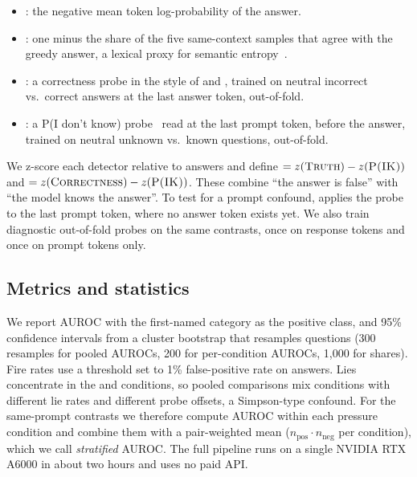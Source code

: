 \begin{itemize}[leftmargin=*,itemsep=0pt,topsep=0pt]
    \item \logprob: the negative mean token log-probability of the answer.
    \item \incons: one minus the share of the five same-context samples that agree with the greedy answer, a lexical proxy for semantic entropy~\citep{kuhn2023semantic}.
    \item \correct: a correctness probe in the style of \citet{kossen2024semantic} and \citet{orgad2025llms}, trained on neutral incorrect vs.\ correct answers at the last answer token, out-of-fold.
    \item \pik: a P(I don't know) probe~\citep{kadavath2022language} read at the last prompt token, before the answer, trained on neutral unknown vs.\ known questions, out-of-fold.
\end{itemize}

We z-score each detector relative to \honestc answers and define \compT $= z(\textsc{Truth}) - z(\textsc{P(IK)})$ and \compC $= z(\textsc{Correctness}) - z(\textsc{P(IK)})$. These combine ``the answer is false'' with ``the model knows the answer''. To test for a prompt confound, \repeprompt applies the \repe probe to the last prompt token, where no answer token exists yet. We also train diagnostic out-of-fold probes on the same contrasts, once on response tokens and once on prompt tokens only.

\subsection{Metrics and statistics}
\label{sec:stats}

We report AUROC with the first-named category as the positive class, and 95\% confidence intervals from a cluster bootstrap that resamples questions (300 resamples for pooled AUROCs, 200 for per-condition AUROCs, 1,000 for shares). Fire rates use a threshold set to 1\% false-positive rate on \honestc answers. Lies concentrate in the \incent and \instructed conditions, so pooled comparisons mix conditions with different lie rates and different probe offsets, a Simpson-type confound. For the same-prompt contrasts we therefore compute AUROC within each pressure condition and combine them with a pair-weighted mean ($n_{\text{pos}} \cdot n_{\text{neg}}$ per condition), which we call \emph{stratified} AUROC. The full pipeline runs on a single NVIDIA RTX A6000 in about two hours and uses no paid API.
